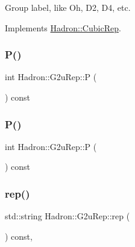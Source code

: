 Group label, like Oh, D2, D4, etc. 

Implements \mbox{\hyperlink{structHadron_1_1CubicRep_a0748f11ec87f387062c8e8981339a29c}{Hadron\+::\+Cubic\+Rep}}.

\mbox{\label{structHadron_1_1G2uRep_a1af743d771e5da3f6746dd72240a94c9}} 
\subsubsection{\texorpdfstring{P()}{P()}\hspace{0.1cm}{\footnotesize\ttfamily [1/2]}}
{\footnotesize\ttfamily int Hadron\+::\+G2u\+Rep\+::P (\begin{DoxyParamCaption}{ }\end{DoxyParamCaption}) const\hspace{0.3cm}{\ttfamily [inline]}}

\mbox{\label{structHadron_1_1G2uRep_a1af743d771e5da3f6746dd72240a94c9}} 
\subsubsection{\texorpdfstring{P()}{P()}\hspace{0.1cm}{\footnotesize\ttfamily [2/2]}}
{\footnotesize\ttfamily int Hadron\+::\+G2u\+Rep\+::P (\begin{DoxyParamCaption}{ }\end{DoxyParamCaption}) const\hspace{0.3cm}{\ttfamily [inline]}}

\mbox{\label{structHadron_1_1G2uRep_ad0a703d8c70aacc4601afb6c47ca40b3}} 
\subsubsection{\texorpdfstring{rep()}{rep()}\hspace{0.1cm}{\footnotesize\ttfamily [1/5]}}
{\footnotesize\ttfamily std\+::string Hadron\+::\+G2u\+Rep\+::rep (\begin{DoxyParamCaption}{ }\end{DoxyParamCaption}) const\hspace{0.3cm}{\ttfamily [inline]}, {\ttfamily [virtual]}}



